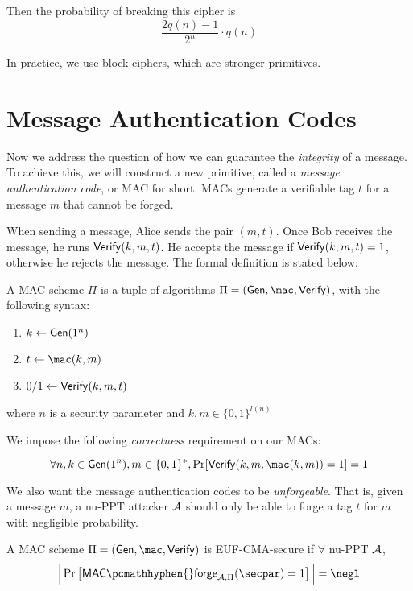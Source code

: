 Then the probability of breaking this cipher is
$$\frac{2q(n) - 1}{2^n} \cdot q(n)$$

In practice, we use block ciphers, which are stronger primitives.

\section{Message Authentication Codes}
Now we address the question of how we can guarantee the \textit{integrity} of a message.
To achieve this, we will construct a new primitive, called a \textit{message authentication code}, or MAC for short. MACs generate a verifiable tag $t$ for a message $m$ that cannot be forged.

When sending a message, Alice sends the pair $(m, t)$.
Once Bob receives the message, he runs $\mathsf{Verify}(k, m, t)$.
He accepts the message if $\mathsf{Verify}(k, m, t) = 1$, otherwise he rejects the message.
The formal definition is stated below:
\begin{definition}
    A MAC scheme $\Pi$ is a tuple of algorithms $\Pi = (\gen, \mac, \Verify)$, with the following syntax:
    \begin{enumerate}
        \item $k \leftarrow \mathsf{Gen}(1^n)$
        \item $t \leftarrow \mac(k,m)$
        \item $0/1 \leftarrow \mathsf{Verify}(k, m, t)$
    \end{enumerate}
    where $n$ is a security parameter and $k, m \in \{0, 1\}^{l(n)}$
\end{definition}

We impose the following \textit{correctness} requirement on our MACs:
\begin{definition}
    $$\forall n, k \in \gen(1^n), m \in \{0, 1\}^*, \Pr[\Verify(k, m, \mac(k, m)) = 1] = 1$$
\end{definition}

We also want the message authentication codes to be \textit{unforgeable}.
That is, given a message $m$, a nu-PPT attacker $\mathcal{A}$ should only be able to forge a tag $t$ for $m$ with negligible probability.
\begin{definition}
    A MAC scheme $\Pi = (\gen,\mac,\Verify)$ is EUF-CMA-secure if $\forall$ nu-PPT $\mathcal{A}$,
    $$\Big| \Pr\left[\mathsf{MAC}\pcmathhyphen{}\mathsf{forge}_{\cA, \Pi}(\secpar) =1\right]\Big| = \negl$$
\end{definition}

